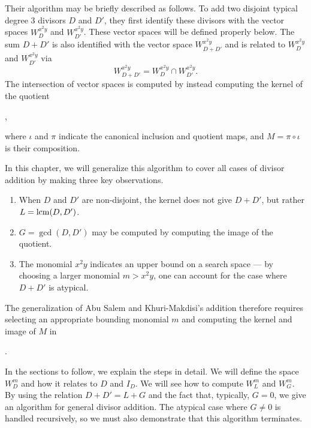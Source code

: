 Their algorithm may be briefly described as follows.
To add two disjoint typical degree 3 divisors $D$ and $D'$,
they first identify these divisors with the vector spaces $W_D^{x^2y}$ and $W_{D'}^{x^2y}$.
These vector spaces will be defined properly below.
The sum $D + D'$ is also identified with the vector space $W_{D + D'}^{x^2y}$
and is related to $W_D^{x^2y}$ and $W_{D'}^{x^2y}$ via
\[ W_{D + D'}^{x^2y} = W_D^{x^2y} \cap W_{D'}^{x^2y}. \]
The intersection of vector spaces is computed by instead computing the kernel of the quotient
\begin{center}
,
\end{center}
where $\iota$ and $\pi$ indicate the canonical inclusion and quotient maps,
and $M = \pi \circ \iota$ is their composition.

In this chapter, we will generalize this algorithm to cover all cases of divisor addition
by making three key observations.
\begin{enumerate}[label=(\roman*)]
  \item When $D$ and $D'$ are non-disjoint, the kernel does not give $D + D'$, but rather $L = \operatorname{lcm}(D, D')$.
  \item $G = \gcd(D, D')$ may be computed by computing the image of the quotient.
  \item The monomial $x^2y$ indicates an upper bound on a search space ---
        by choosing a larger monomial $m > x^2y$, one can account for the case where
        $D + D'$ is atypical.
\end{enumerate}
The generalization of Abu Salem and Khuri-Makdisi's addition therefore requires
selecting an appropriate bounding monomial $m$ and computing the kernel and image of $M$ in
\begin{center}
.
\end{center}
In the sections to follow, we explain the steps in detail.
We will define the space $W_D^m$ and how it relates to $D$ and $I_D$.
We will see how to compute $W_L^m$ and $W_G^m$.
By using the relation $D + D' = L + G$ and the fact that, typically, $G = 0$,
we give an algorithm for general divisor addition.
The atypical case where $G \neq 0$ is handled recursively,
so we must also demonstrate that this algorithm terminates.



